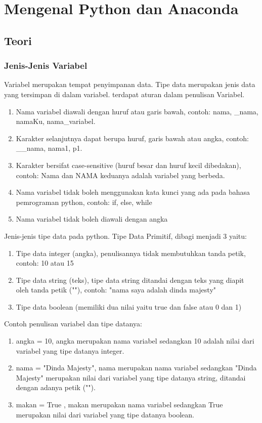 \chapter{Mengenal Python dan Anaconda}

\section{Teori}
\subsection{Jenis-Jenis Variabel}
Variabel merupakan tempat penyimpanan data. Tipe data merupakan jenis data yang tersimpan di dalam variabel. terdapat aturan dalam penulisan Variabel.
\begin{enumerate}
 \item Nama variabel diawali dengan huruf atau garis bawah, contoh: nama, \_nama, namaKu, nama\_variabel.
 \item Karakter selanjutnya dapat berupa huruf, garis bawah atau angka, contoh: \_\_nama, nama1, p1.
 \item Karakter bersifat case-sensitive (huruf besar dan huruf kecil dibedakan), contoh: Nama dan NAMA keduanya adalah variabel yang berbeda.
 \item Nama variabel tidak boleh menggunakan kata kunci yang ada pada bahasa pemrograman python, contoh: if, else, while
 \item Nama variabel tidak boleh diawali dengan angka
\end{enumerate}

Jenis-jenis tipe data pada python.
Tipe Data Primitif, dibagi menjadi 3 yaitu:
\begin{enumerate}
 \item Tipe data integer (angka), penulisannya tidak membutuhkan tanda petik, contoh: 10 atau 15
 \item Tipe data string (teks), tipe data string ditandai dengan teks yang diapit oleh tanda petik (""), contoh: "nama saya adalah dinda majesty"
 \item Tipe data boolean (memiliki dua nilai yaitu true dan false atau 0 dan 1)
\end{enumerate}

Contoh penulisan variabel dan tipe datanya:
\begin{enumerate}
 \item angka = 10, angka merupakan nama variabel sedangkan 10 adalah nilai dari variabel yang tipe datanya integer.
 \item nama = "Dinda Majesty", nama merupakan nama variabel sedangkan "Dinda Majesty" merupakan nilai dari variabel yang tipe datanya string, ditandai dengan adanya petik ("").
 \item makan = True , makan merupakan nama variabel sedangkan True merupakan nilai dari variabel yang tipe datanya boolean.
\end{enumerate}

